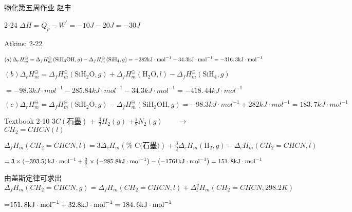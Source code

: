 \documentclass{ctexart}
\begin{document}
\bigskip 物化第五周作业\qquad 
赵丰

2-24 $\Delta H=Q_{p}-W^{\prime }=-10\unit{J}-20\unit{J}=-30\unit{J}$

Atkins: 2-22

$\left( a\right) \Delta _{r}H_{m}^{\ominus }=\Delta _{f}H_{m}^{\ominus
}\left( \text{SiH}_{3}\text{OH},g\right) -\Delta _{f}H_{m}^{\ominus }\left( 
\text{SiH}_{4},g\right) =-282\unit{kJ}\cdot \unit{mol}^{-1}-34.3\unit{kJ}%
\cdot \unit{mol}^{-1}=\allowbreak -316.\,\allowbreak 3\unit{kJ}\cdot \unit{%
mol}^{-1}$

$\left( b\right) \Delta _{r}H_{m}^{\ominus }=\Delta _{f}H_{m}^{\ominus
}\left( \text{SiH}_{2}\text{O},g\right) +\Delta _{f}H_{m}^{\ominus }\left( 
\text{H}_{2}\text{O},l\right) -\Delta _{f}H_{m}^{\ominus }\left( \text{SiH}%
_{4},g\right) $

$=-98.3\unit{kJ}\cdot \unit{mol}^{-1}-285.84\unit{kJ}\cdot \unit{mol}%
^{-1}-34.3\unit{kJ}\cdot \unit{mol}^{-1}=\allowbreak -418.\,\allowbreak 44%
\unit{kJ}\cdot \unit{mol}^{-1}$

$\left( c\right) \Delta _{r}H_{m}^{\ominus }=\Delta _{f}H_{m}^{\ominus
}\left( \text{SiH}_{2}\text{O},g\right) -\Delta _{f}H_{m}^{\ominus }\left( 
\text{SiH}_{3}\text{OH},g\right) =-98.3\unit{kJ}\cdot \unit{mol}^{-1}+282%
\unit{kJ}\cdot \unit{mol}^{-1}=\allowbreak 183.\,\allowbreak 7\unit{kJ}\cdot 
\unit{mol}^{-1}$

Textbook 2-10 $3C\left( \text{石墨}\right) $ + $\frac{3}{2}%
H_{2}\left( g\right) $ +$\frac{1}{2}N_{2}\left( g\right) \qquad \rightarrow $
$CH_{2}=CHCN\left( l\right) \qquad $

$\Delta _{f}H_{m}\left( CH_{2}=CHCN,l\right) =3\Delta _{c}H_{m}\left( \text{%
C(石墨)}\right) +\frac{3}{2}\Delta _{c}H_{m}\left( \text{H}%
_{2},g\right) -\Delta _{c}H_{m}\left( CH_{2}=CHCN,l\right) $

$=3\times \left( -393.5\right) \unit{kJ}\cdot \unit{mol}^{-1}+\frac{3}{2}%
\times \left( -285.8\unit{kJ}\cdot \unit{mol}^{-1}\right) -\left( -1761\unit{%
kJ}\cdot \unit{mol}^{-1}\right) =\allowbreak 151.\,\allowbreak 8\unit{kJ}%
\cdot \unit{mol}^{-1}$

\bigskip 由盖斯定律可求出%
\qquad $\Delta _{f}H_{m}\left( CH_{2}=CHCN,g\right) =\Delta _{f}H_{m}\left(
CH_{2}=CHCN,l\right) +\Delta _{l}^{g}H_{m}\left( CH_{2}=CHCN,298.2\unit{K}%
\right) $

=$151.\,\allowbreak 8\unit{kJ}\cdot \unit{mol}^{-1}+32.8\unit{kJ}\cdot \unit{%
mol}^{-1}=\allowbreak 184.\,\allowbreak 6\unit{kJ}\cdot \unit{mol}^{-1}$
\end{document}
